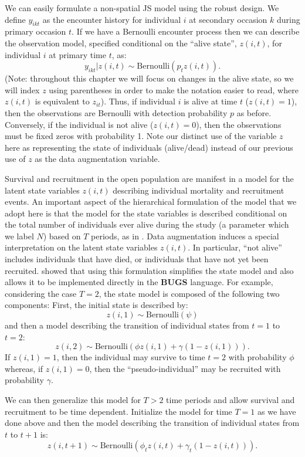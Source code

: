 We can easily formulate a non-spatial JS model using the robust
design. We define $y_{ikt}$ as the encounter history for individual
$i$ at secondary occasion $k$ during primary occasion $t$.  If we have
a Bernoulli encounter process then we can describe the observation
model, specified conditional on the ``alive state'', $z(i,t)$, for
individual $i$ at primary time $t$, as:
 \[
  y_{ikt}|z(i,t) \sim
\mbox{Bernoulli}(p_t z(i,t)).
\]
(Note: throughout this chapter we will focus on changes in the 
alive state, so we will index $z$ using parentheses in order to make the notation easier to read,
where $z(i,t)$ is equivalent to $z_{it}$).
Thus, if individual $i$ is alive at time $t$ ($z(i,t)=1$), then the
observations are Bernoulli with detection probability $p$ as before.  Conversely, if the individual is
not alive ($z(i,t)=0$), then the observations must be fixed zeros with
probability 1. Note our distinct use of the variable $z$ here as
representing the state of individuals (alive/dead) instead of our
previous use of $z$ as the data augmentation variable. 

Survival and recruitment in the open population are manifest in a
model for the latent state variables $z(i,t)$ describing individual
mortality and recruitment events.  An important aspect of the
hierarchical formulation of the model that we adopt here is that the
model for the state variables is described conditional on the total
number of individuals ever alive during the study (a parameter which
we label $N$) based on $T$ periods, as in
\citet{schwarz_arnason:1996}.  Data augmentation induces a special
interpretation on the latent state variables $z(i,t)$.  In particular,
``not alive'' includes individuals that have died, or individuals that
have not yet been recruited.  \citet{royle_dorazio:2008} showed that
using this formulation simplifies the state model and also allows it
to be implemented directly in the \textbf{BUGS} language.  For
example, considering the case $T=2$, the state model is composed of
the following two components: First, the initial state is described
by:
\[
 z(i,1) \sim \mbox{Bernoulli}(\psi)
\]
and then a model describing the transition of individual states from
$t=1$ to $t=2$:
\[
 z(i,2) \sim \mbox{Bernoulli}( \phi z(i,1)  + \gamma (1-z(i,1)) ).
\]
If $z(i,1)=1$, then the individual may survive to time $t=2$ with
probability $\phi$ whereas, if $z(i,1)=0$, then the
``pseudo-individual'' may be recruited with probability $\gamma$.

We can then generalize this model for $T>2$ time periods and allow
survival and recruitment to be time dependent.  Initialize the model
for time $T=1$ as we have done above and then the model describing the
transition of individual states from $t$ to $t+1$ is:
\[
 z(i,t+1) \sim \mbox{Bernoulli}( \phi_t z(i,t)  + \gamma_t (1-z(i,t)) ).
\]

